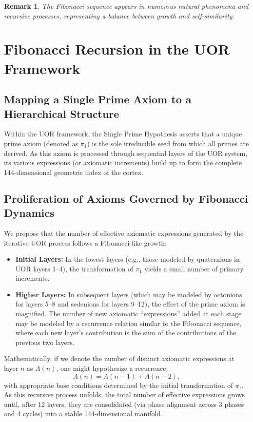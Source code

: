 \documentclass[11pt]{article}
\newtheorem{remark}{Remark}[section]
\begin{document}
\begin{remark}
The Fibonacci sequence appears in numerous natural phenomena and recursive processes, representing a balance between growth and self-similarity.
\end{remark}

\section{Fibonacci Recursion in the UOR Framework}
\subsection{Mapping a Single Prime Axiom to a Hierarchical Structure}
Within the UOR framework, the Single Prime Hypothesis asserts that a unique prime axiom (denoted as \(\pi_1\)) is the sole irreducible seed from which all primes are derived. As this axiom is processed through sequential layers of the UOR system, its various expressions (or axiomatic increments) build up to form the complete 144-dimensional geometric index of the cortex.

\subsection{Proliferation of Axioms Governed by Fibonacci Dynamics}
We propose that the number of effective axiomatic expressions generated by the iterative UOR process follows a Fibonacci-like growth:
\begin{itemize}
    \item \textbf{Initial Layers:} In the lowest layers (e.g., those modeled by quaternions in UOR layers 1--4), the transformation of \(\pi_1\) yields a small number of primary increments.
    \item \textbf{Higher Layers:} In subsequent layers (which may be modeled by octonions for layers 5--8 and sedenions for layers 9--12), the effect of the prime axiom is magnified. The number of new axiomatic “expressions” added at each stage may be modeled by a recurrence relation similar to the Fibonacci sequence, where each new layer’s contribution is the sum of the contributions of the previous two layers.
\end{itemize}

Mathematically, if we denote the number of distinct axiomatic expressions at layer \(n\) as \(A(n)\), one might hypothesize a recurrence:
\[
A(n) = A(n-1) + A(n-2),
\]
with appropriate base conditions determined by the initial transformation of \(\pi_1\). As this recursive process unfolds, the total number of effective expressions grows until, after 12 layers, they are consolidated (via phase alignment across 3 phases and 4 cycles) into a stable 144-dimensional manifold.
\end{document}
